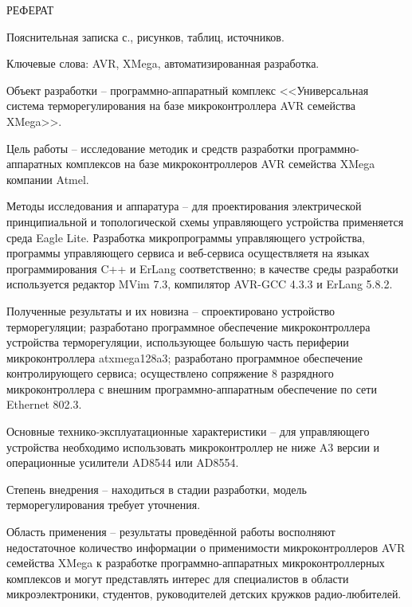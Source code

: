 \begin{center}\MakeUppercase{Реферат}\end{center}

Пояснительная записка  с.,  рисунков,  таблиц,
 источников.


Ключевые слова: AVR, XMega, автоматизированная разработка.


Объект разработки -- программно-аппаратный комплекс <<Универсальная система терморегулирования
 на базе микроконтроллера AVR семейства XMega>>.

Цель работы -- исследование методик и средств разработки про\-гра\-ммно\--аппа\-ра\-тных комплексов на базе
микроконтроллеров AVR семейства XMega компании Atmel.

Методы исследования и аппаратура -- для проектирования электрической принципиальной и
топологической схемы управляющего устройства применяется среда Eagle Lite. Разработка
микропрограммы управляющего устройства, программы управляющего сервиса и веб-сервиса осуществляетя
на языках программирования C++ и ErLang соответственно; в качестве среды разработки используется
редактор MVim 7.3, компилятор AVR-GCC 4.3.3 и ErLang 5.8.2.

Полученные результаты и их новизна -- спроектировано устройство терморегуляции; разработано
	программное обеспечение микроконтроллера устройства терморегуляции, использующее большую
	часть периферии микроконтроллера atxmega128a3; разработано
	программное обеспечение контролирующего сервиса; осуществлено сопряжение 8 разрядного
	микроконтроллера с внешним программно-аппаратным обеспечение по сети Ethernet 802.3.


Основные технико-эксплуатационные характеристики -- для управляющего устройства необходимо использовать
микроконтроллер не ниже A3 версии и операционные усилители AD8544 или AD8554.

Степень внедрения -- находиться в стадии разработки, модель терморегулирования требует уточнения.

Область применения -- результаты проведённой работы восполняют недостаточное количество информации
о применимости микроконтроллеров AVR семейства XMega к разработке программно-аппаратных микроконтроллерных
комплексов и могут представлять интерес для специалистов в
области микроэлектроники, студентов, руководителей детских кружков радио-любителей.

\newpage{}









